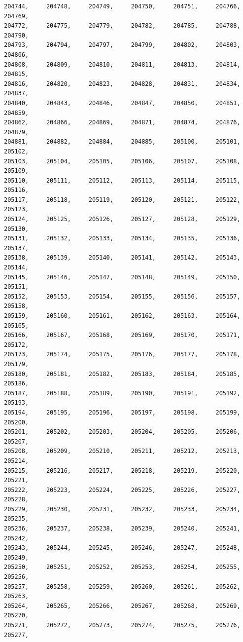 \documentclass[a4paper,11pt]{report}
\begin{document}
\begin{verbatim}
204744,     204748,     204749,     204750,     204751,     204766,     204769,
204772,     204775,     204779,     204782,     204785,     204788,     204790,
204793,     204794,     204797,     204799,     204802,     204803,     204806,
204808,     204809,     204810,     204811,     204813,     204814,     204815,
204816,     204820,     204823,     204828,     204831,     204834,     204837,
204840,     204843,     204846,     204847,     204850,     204851,     204859,
204862,     204866,     204869,     204871,     204874,     204876,     204879,
204881,     204882,     204884,     204885,     205100,     205101,     205102,
205103,     205104,     205105,     205106,     205107,     205108,     205109,
205110,     205111,     205112,     205113,     205114,     205115,     205116,
205117,     205118,     205119,     205120,     205121,     205122,     205123,
205124,     205125,     205126,     205127,     205128,     205129,     205130,
205131,     205132,     205133,     205134,     205135,     205136,     205137,
205138,     205139,     205140,     205141,     205142,     205143,     205144,
205145,     205146,     205147,     205148,     205149,     205150,     205151,
205152,     205153,     205154,     205155,     205156,     205157,     205158,
205159,     205160,     205161,     205162,     205163,     205164,     205165,
205166,     205167,     205168,     205169,     205170,     205171,     205172,
205173,     205174,     205175,     205176,     205177,     205178,     205179,
205180,     205181,     205182,     205183,     205184,     205185,     205186,
205187,     205188,     205189,     205190,     205191,     205192,     205193,
205194,     205195,     205196,     205197,     205198,     205199,     205200,
205201,     205202,     205203,     205204,     205205,     205206,     205207,
205208,     205209,     205210,     205211,     205212,     205213,     205214,
205215,     205216,     205217,     205218,     205219,     205220,     205221,
205222,     205223,     205224,     205225,     205226,     205227,     205228,
205229,     205230,     205231,     205232,     205233,     205234,     205235,
205236,     205237,     205238,     205239,     205240,     205241,     205242,
205243,     205244,     205245,     205246,     205247,     205248,     205249,
205250,     205251,     205252,     205253,     205254,     205255,     205256,
205257,     205258,     205259,     205260,     205261,     205262,     205263,
205264,     205265,     205266,     205267,     205268,     205269,     205270,
205271,     205272,     205273,     205274,     205275,     205276,     205277,

\end{verbatim}
\end{document}
